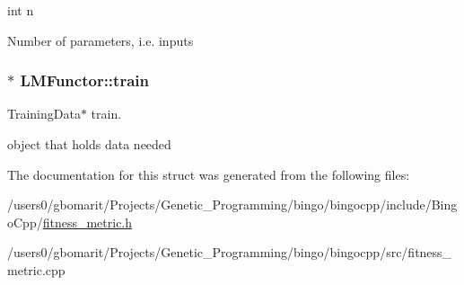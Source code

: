 int n 

Number of parameters, i.\+e. inputs 
\subsubsection[{\texorpdfstring{train}{train}}]{$\ast$ L\+M\+Functor\+::train}\hypertarget{structLMFunctor_a025c08d9282710fb0766dcee6dd8ff07}{}\label{structLMFunctor_a025c08d9282710fb0766dcee6dd8ff07}


Training\+Data$\ast$ train. 

object that holds data needed 

The documentation for this struct was generated from the following files\+:\begin{DoxyCompactItemize}
\item 
/users0/gbomarit/\+Projects/\+Genetic\+\_\+\+Programming/bingo/bingocpp/include/\+Bingo\+Cpp/\hyperlink{fitness__metric_8h}{fitness\+\_\+metric.\+h}\item 
/users0/gbomarit/\+Projects/\+Genetic\+\_\+\+Programming/bingo/bingocpp/src/fitness\+\_\+metric.\+cpp\end{DoxyCompactItemize}
